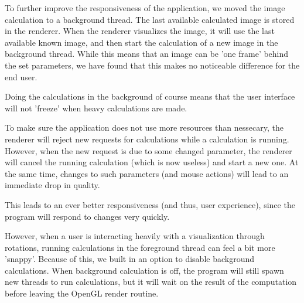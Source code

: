 To further improve the responsiveness of the application, we moved the image calculation to a background thread.
The last available calculated image is stored in the renderer.
When the renderer visualizes the image, it will use the last available known image, and then start the calculation of a new image in the background thread.
While this means that an image can be 'one frame' behind the set parameters, we have found that this makes no noticeable difference for the end user.

Doing the calculations in the background of course means that the user interface will not 'freeze' when heavy calculations are made.

To make sure the application does not use more resources than nessecary, the renderer will reject new requests for calculations while a calculation is running.
However, when the new request is due to some changed parameter, the renderer will cancel the running calculation (which is now useless) and start a new one.
At the same time, changes to such parameters (and mouse actions) will lead to an immediate drop in quality.

This leads to an ever better responsiveness (and thus, user experience), since the program will respond to changes very quickly.

However, when a user is interacting heavily with a visualization through rotations, running calculations in the foreground thread can feel a bit more 'snappy'.
Because of this, we built in an option to disable background calculations.
When background calculation is off, the program will still spawn new threads to run calculations, but it will wait on the result of the computation before leaving the OpenGL render routine.
